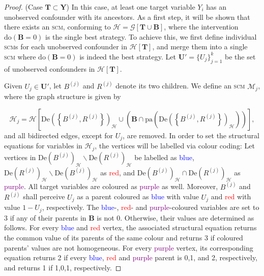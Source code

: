 \begin{proof}
    (Case $\mathbf{T} \subset \mathbf{Y}$) In this case, at least one target variable $Y_i$ has an unobserved confounder with its ancestors. As a first step, it will be shown that there exists an \textsc{scm}, conforming to $\mathcal{H} = \mathcal{G}[\mathbf{T} \cup \mathbf{B}]$, where the intervention $\text{do}(\mathbf{B} = 0)$ is the single best strategy. To achieve this, we first define individual \textsc{scm}s for each unobserved confounder in $\mathcal{H}[\mathbf{T}]$, and merge them into a single \textsc{scm} where $\text{do}(\mathbf{B} = 0)$ is indeed the best strategy. Let $\mathbf{U}' = \{ U_j\}_{j=1}^k$ be the set of unobserved confounders in $\mathcal{H}[\mathbf{T}]$.

    Given $U_j \in \mathbf{U}'$, let $B^{(j)}$ and $R^{(j)}$ denote its two children. We define an \textsc{scm} $\mathcal{M}_j$, where the graph structure is given by
 
    \begin{equation}
        \mathcal{H}_j = \mathcal{H} \left[ \text{De}\left( \left\{ B^{(j)}, R^{(j)}\right\}\right)_{\mathcal{H}} \cup \left( \mathbf{B} \cap \text{pa}\left(\text{De} \left( \left\{ B^{(j)}, R^{(j)}\right\} \right)_{\mathcal{H}} \right) \right)\right],
    \end{equation}
    and all bidirected edges, except for $U_j$, are removed. In order to set the structural equations for variables in $\mathcal{H}_j$, the vertices will be labelled via colour coding: Let vertices in $\text{De}\left(B^{(j)}\right)_{\mathcal{H}} \backslash \text{De}\left(R^{(j)}\right)_{\mathcal{H}}$ be labelled as \textcolor{blue}{blue}, $\text{De}\left(R^{(j)}\right)_{\mathcal{H}} \backslash \text{De}\left(B^{(j)}\right)_{\mathcal{H}}$ as \textcolor{red}{red}, and $\text{De}\left(B^{(j)}\right)_{\mathcal{H}} \cap \text{De}\left(R^{(j)}\right)_{\mathcal{H}}$ as \textcolor{purple}{purple}. All target variables are coloured as \textcolor{purple}{purple} as well. Moreover, $B^{(j)}$ and $R^{(j)}$ shall perceive $U_j$ as a parent coloured as \textcolor{blue}{blue} with value $U_j$ and \textcolor{red}{red} with value $1-U_j$, respectively. The \textcolor{blue}{blue}-, \textcolor{red}{red}- and \textcolor{purple}{purple}-coloured variables are set to 3 if any of their parents in $\mathbf{B}$ is not 0. Otherwise, their values are determined as follows. For every \textcolor{blue}{blue} and \textcolor{red}{red} vertex, the associated structural equation returns the common value of its parents of the same colour and returns 3 if coloured parents' values are not homogeneous. For every \textcolor{purple}{purple} vertex, its corresponding equation returns 2 if every \textcolor{blue}{blue}, \textcolor{red}{red} and \textcolor{purple}{purple} parent is 0,1, and 2, respectively, and returns 1 if 1,0,1, respectively.


\end{proof}
